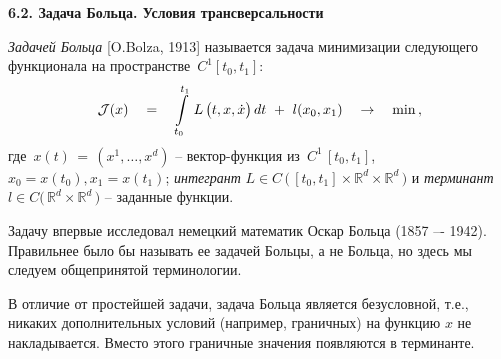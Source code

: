 \documentclass[12pt,a4paper]{article}
\newcommand{\re}{{\mathbb R}}
\newcommand{\cJ}{{\cal{J}}}
\begin{document}
\bigskip

\begin{center}
\textbf{6.2. Задача Больца. Условия трансверсальности}
\end{center}
\bigskip







{\it  Задачей Больца} [O.Bolza, 1913] называется задача  минимизации следующего
функционала на пространстве~$C^1[t_0, t_1]$:
\begin{equation}\label{Boltz}
\cJ(x)\quad = \quad \int\limits_{t_0}^{t_1}\, L\, \bigl(t, x, \dot
x \bigr)\, d t\ + \ l(x_0, x_1)\quad \to \quad \min\, ,
\end{equation}
где  $\, x(t) \, = \, (x^1, \ldots , x^d)$ -- вектор-функция из~$C^1\,[t_0, t_1]$, $x_0 =
x(t_0), x_1 = x(t_1)$; {\em интегрант} $L\in C\, \bigl( \, [t_0,
t_1]\times \re^d \times \re^d\, \bigr)$ и {\em
терминант} $l \in C\bigl( \, \re^d \times \re^d\, 
\bigr)$ -- заданные функции.

Задачу впервые исследовал немецкий математик
Оскар Больца (1857 –- 1942). Правильнее было бы называть ее задачей Больцы, а не Больца, но здесь мы следуем общепринятой терминологии.

В отличие от простейшей задачи,
задача Больца является безусловной, т.е., никаких дополнительных
условий (например, граничных) на функцию $x$ не накладывается.
Вместо этого граничные значения появляются в терминанте.
\end{document}
